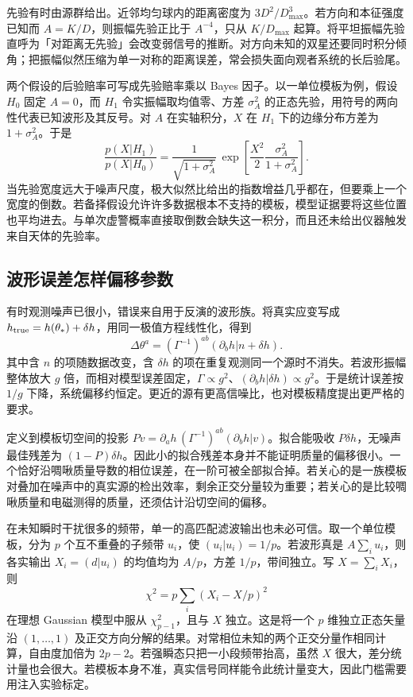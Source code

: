先验有时由源群给出。近邻均匀球内的距离密度为 $3D^2/D_{\max}^3$。若方向和本征强度已知而 $A=K/D$，则振幅先验正比于 $A^{-4}$，只从 $K/D_{\max}$ 起算。将平坦振幅先验直呼为「对距离无先验」会改变弱信号的推断。对方向未知的双星还要同时积分倾角；把振幅似然压缩为单一对称的距离误差，常会损失面向观者系统的长后验尾。

两个假设的后验赔率可写成先验赔率乘以 Bayes 因子。以一单位模板为例，假设 $H_0$ 固定 $A=0$，而 $H_1$ 令实振幅取均值零、方差 $\sigma_A^2$ 的正态先验，用符号的两向性代表已知波形及其反号。对 $A$ 在实轴积分，$X$ 在 $H_1$ 下的边缘分布方差为 $1+\sigma_A^2$。于是
\[
 \frac{p(X|H_1)}{p(X|H_0)}
 =\frac{1}{\sqrt{1+\sigma_A^2}}\,
 \exp\!\left[\frac{X^2}{2}\frac{\sigma_A^2}{1+\sigma_A^2}\right].
\]
当先验宽度远大于噪声尺度，极大似然比给出的指数增益几乎都在，但要乘上一个宽度的倒数。若备择假设允许许多数据根本不支持的模板，模型证据要将这些位置也平均进去。与单次虚警概率直接取倒数会缺失这一积分，而且还未给出仪器触发来自天体的先验率。

\subsection{波形误差怎样偏移参数}
有时观测噪声已很小，错误来自用于反演的波形族。将真实应变写成 $h_{\rm true}=h(\theta_*)+\delta h$，用同一极值方程线性化，得到
\[
 \Delta\theta^a=(\Gamma^{-1})^{ab}(\partial_b h|n+\delta h).
\]
其中含 $n$ 的项随数据改变，含 $\delta h$ 的项在重复观测同一个源时不消失。若波形振幅整体放大 $g$ 倍，而相对模型误差固定，$\Gamma\propto g^2$、$(\partial_bh|\delta h)\propto g^2$。于是统计误差按 $1/g$ 下降，系统偏移约恒定。更近的源有更高信噪比，也对模板精度提出更严格的要求。

定义到模板切空间的投影 $P v=\partial_a h\,(\Gamma^{-1})^{ab}(\partial_b h|v)$。拟合能吸收 $P\delta h$，无噪声最佳残差为 $(1-P)\delta h$。因此小的拟合残差本身并不能证明质量的偏移很小。一个恰好沿啁啾质量导数的相位误差，在一阶可被全部拟合掉。若关心的是一族模板对叠加在噪声中的真实源的检出效率，剩余正交分量较为重要；若关心的是比较啁啾质量和电磁测得的质量，还须估计沿切空间的偏移。

在未知瞬时干扰很多的频带，单一的高匹配滤波输出也未必可信。取一个单位模板，分为 $p$ 个互不重叠的子频带 $u_i$，使 $(u_i|u_i)=1/p$。若波形真是 $A\sum_i u_i$，则各实输出 $X_i=(d|u_i)$ 的均值均为 $A/p$，方差 $1/p$，带间独立。写 $X=\sum_i X_i$，则
\[
 \chi^2=p\sum_i(X_i-X/p)^2
\]
在理想 Gaussian 模型中服从 $\chi^2_{p-1}$，且与 $X$ 独立。这是将一个 $p$ 维独立正态矢量沿 $(1,\dots,1)$ 及正交方向分解的结果。对常相位未知的两个正交分量作相同计算，自由度加倍为 $2p-2$。若强瞬态只把一小段频带抬高，虽然 $X$ 很大，差分统计量也会很大。若模板本身不准，真实信号同样能令此统计量变大，因此门槛需要用注入实验标定。


